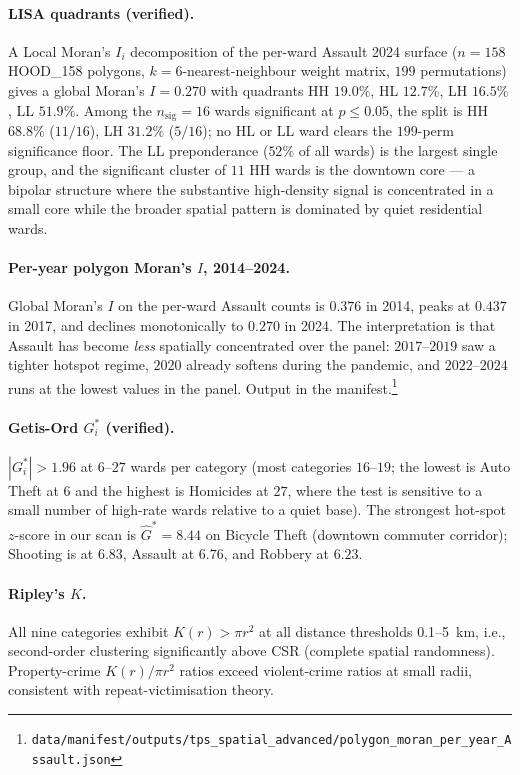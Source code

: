 \documentclass[article,shortnames,nojss]{jss}
\begin{document}
\paragraph{LISA quadrants (verified).}  A Local Moran's $I_i$
decomposition of the per-ward Assault 2024 surface ($n=158$
HOOD\_158 polygons, $k=6$-nearest-neighbour weight matrix,
$199$ permutations) gives a global Moran's $I = 0.270$ with
quadrants HH $19.0\%$, HL $12.7\%$, LH $16.5\%$, LL $51.9\%$.
Among the $n_{\text{sig}}=16$ wards significant at $p\le 0.05$,
the split is HH $68.8\%$ ($11/16$), LH $31.2\%$ ($5/16$); no
HL or LL ward clears the $199$-perm significance floor.  The
LL preponderance ($52\%$ of all wards) is the largest single
group, and the significant cluster of $11$ HH wards is the
downtown core --- a bipolar structure
where the substantive high-density signal is concentrated in a
small core while the broader spatial pattern is dominated by
quiet residential wards.

\paragraph{Per-year polygon Moran's $I$, 2014--2024.}  Global
Moran's $I$ on the per-ward Assault counts is $0.376$ in
2014, peaks at $0.437$ in 2017, and declines monotonically to
$0.270$ in 2024.  The interpretation is that Assault has
become \emph{less} spatially concentrated over the panel:
$2017$--$2019$ saw a tighter hotspot regime, $2020$ already
softens during the pandemic, and $2022$--$2024$ runs at the
lowest values in the panel.  Output in the
manifest.\footnote{\texttt{data/manifest/outputs/tps\_spatial\_advanced/polygon\_moran\_per\_year\_Assault.json}}

\paragraph{Getis-Ord $G^\ast_i$ (verified).}  $|G^\ast_i|>1.96$
at $6$--$27$ wards per category (most categories $16$--$19$;
the lowest is Auto Theft at $6$ and the highest is Homicides at
$27$, where the test is sensitive to a small number of high-rate
wards relative to a quiet base).  The strongest hot-spot
$z$-score in our scan is $\hat G^\ast = 8.44$ on Bicycle Theft
(downtown commuter corridor); Shooting is at $6.83$, Assault at
$6.76$, and Robbery at $6.23$.

\paragraph{Ripley's $K$.}  All nine categories exhibit
$K(r)>\pi r^2$ at all distance thresholds 0.1--5~km, i.e.,
second-order clustering significantly above CSR (complete spatial
randomness).  Property-crime $K(r)/\pi r^2$ ratios exceed
violent-crime ratios at small radii, consistent with
repeat-victimisation theory.
\end{document}
